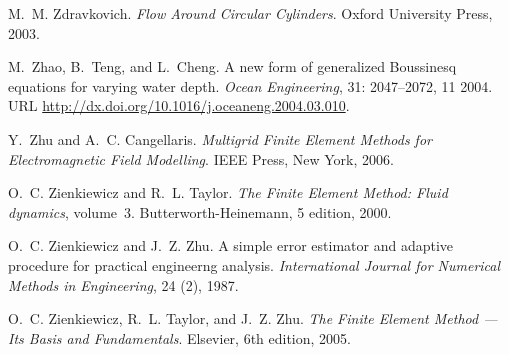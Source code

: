 \begin{thebibliography}{467}
M.~M. Zdravkovich.
\newblock \emph{Flow Around Circular Cylinders}.
\newblock Oxford University Press, 2003.

M.~Zhao, B.~Teng, and L.~Cheng.
\newblock A new form of generalized {B}oussinesq equations for varying water
  depth.
\newblock \emph{Ocean Engineering}, 31: 2047--2072, 11 2004.
\newblock URL \url{http://dx.doi.org/10.1016/j.oceaneng.2004.03.010}.

Y.~Zhu and A.~C. Cangellaris.
\newblock \emph{Multigrid Finite Element Methods for Electromagnetic Field
  Modelling}.
\newblock IEEE Press, New York, 2006.

O.~C. Zienkiewicz and R.~L. Taylor.
\newblock \emph{The Finite Element Method: Fluid dynamics}, volume~3.
\newblock Butterworth-Heinemann, 5 edition, 2000.

O.~C. Zienkiewicz and J.~Z. Zhu.
\newblock A simple error estimator and adaptive procedure for practical
  engineerng analysis.
\newblock \emph{International Journal for Numerical Methods in Engineering},
  24 (2), 1987.

O.~C. Zienkiewicz, R.~L. Taylor, and J.~Z. Zhu.
\newblock \emph{The Finite Element Method --- Its Basis and Fundamentals}.
\newblock Elsevier, 6th edition, 2005.

\end{thebibliography}


\printindex
